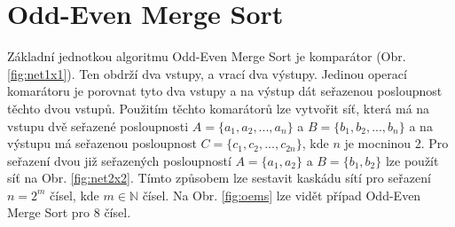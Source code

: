 \documentclass[12pt,a4paper]{article}
\begin{document}

\section{Odd-Even Merge Sort}
\label{sec:odd_even_merge_sort}
Základní jednotkou algoritmu Odd-Even Merge Sort je komparátor (Obr. \ref{fig:net1x1}). 
Ten obdrží dva vstupy, a vrací dva výstupy. Jedinou operací komarátoru je porovnat tyto dva vstupy a na výstup dát seřazenou posloupnost těchto dvou vstupů.
Použitím těchto komarátorů lze vytvořit síť, která má na vstupu dvě seřazené posloupnosti $A = \{a_1, a_2, ..., a_n\}$ a $B = \{b_1, b_2, ..., b_n\}$ a na výstupu má seřazenou posloupnost $C = \{c_1, c_2, ..., c_{2n}\}$, kde $n$ je mocninou 2. 
Pro seřazení dvou již seřazených posloupností $A = \{a_1, a_2\}$ a $B = \{b_1, b_2\}$ lze použít síť na Obr. \ref{fig:net2x2}. 
Tímto způsobem lze sestavit kaskádu sítí pro seřazení $n = 2^m$ čísel, kde $m \in \mathbb{N}$ čísel. 
Na Obr. \ref{fig:oems} lze vidět případ Odd-Even Merge Sort pro 8 čísel.
\end{document}

